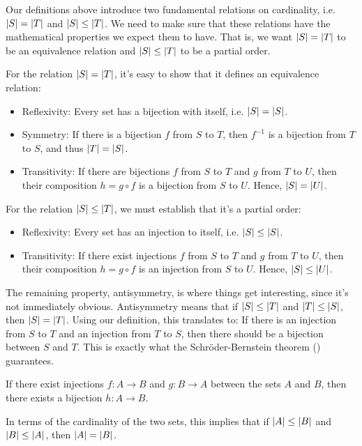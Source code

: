 \documentclass[11pt,twoside=off,numbers=noenddot]{scrbook}
\begin{document}
\begin{remark}
  Our definitions above introduce two fundamental relations on
  cardinality, i.e. $| S | = | T |$ and $| S | \leq
  | T |$. We need to make sure that these relations have the
  mathematical properties we expect them to have. That is, we want
  $| S | = | T |$ to be an equivalence relation and $| S |
  \leq | T |$ to be a partial order.

  For the relation $| S | = | T |$, it's easy to show that it
  defines an equivalence relation:
  \begin{itemize}
    \item Reflexivity: Every set has a bijection with itself, i.e.
      $| S | = | S |$.
    \item Symmetry: If there is a bijection $f$ from $S$ to $T$, then
      $f^{-1}$ is a bijection from $T$ to $S$, and thus $| T | = | S |$.
    \item Transitivity: If there are bijections $f$ from $S$ to $T$
      and $g$ from $T$ to $U$, then their composition $h = g \circ f$
      is a bijection from $S$ to $U$. Hence, $| S | = | U |$.
  \end{itemize}

  For the relation $| S | \leq | T |$, we must establish that
  it's a partial order:
  \begin{itemize}
    \item Reflexivity: Every set has an injection to itself, i.e.
      $| S | \leq | S |$.
    \item Transitivity: If there exist injections $f$ from $S$ to $T$
      and $g$ from $T$ to $U$, then their composition $h = g \circ f$
      is an injection from $S$ to $U$. Hence, $| S | \leq | U |$.
  \end{itemize}

  The remaining property, antisymmetry, is where things get
  interesting, since it's not immediately obvious. Antisymmetry means
  that if $| S | \leq | T |$ and $| T | \leq | S |$, then
  $| S | = | T |$. Using our definition, this translates to: If
  there is an injection from $S$ to $T$ and an injection from $T$ to
  $S$, then there should be a bijection between $S$ and $T$. This is
  exactly what the Schröder-Bernstein theorem
  () guarantees.
\end{remark}

\begin{theorem}
  If there exist injections $f : A \to B$ and $g : B \to A$ between
  the sets $A$ and $B$, then there exists a bijection $h : A \to B$.

  In terms of the cardinality of the two sets, this implies that if
  $| A | \leq | B |$ and $| B | \leq | A |$, then
  $| A | = | B |$.
\end{theorem}
\end{document}
